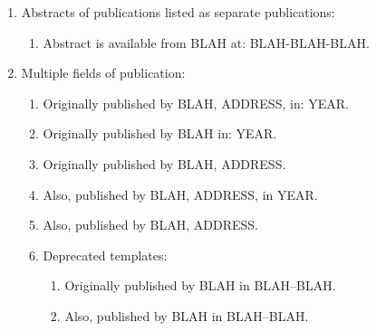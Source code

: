 \documentclass[letter,12pt]{article}
\begin{document}
\begin{enumerate}
\begin{enumerate}
\begin{enumerate}
			\begin{enumerate} \itemsep -1pt
			\item {\tt incollection} (with titles for chapters, sections, subsections, and subsubsections), for the {\tt book}, {\tt booklet}, {\tt techreport}, {\tt phdthesis}, and {\tt mastersthesis}, and {\tt manual} {\sc Bib}\TeX\ entry types.
			\item {\tt inbook} (without titles for chapters, sections, subsections, and subsubsections), for the {\tt book}, {\tt booklet}, {\tt techreport}, {\tt phdthesis}, and {\tt mastersthesis}, and {\tt manual} {\sc Bib}\TeX\ entry types.
			\item {\tt inproceedings}, for the {\tt proceedings} {\sc Bib}\TeX\ entry type.
			\item {\tt article}, for the {\tt book} and {\tt booklet} {\sc Bib}\TeX\ entry types.
			\end{enumerate}
		\item Part of the book/report: BLAH.
		\item This article is part of the journal/magazine issue: BibTeX-KEY.
		\end{enumerate}
	\item Abstracts of publications listed as separate publications: \vspace{-0.2cm}
		\begin{enumerate} \itemsep -2pt
		\item Abstract is available from BLAH at: BLAH-BLAH-BLAH.
		\end{enumerate}
	\item Multiple fields of publication: \vspace{-0.2cm}
		\begin{enumerate} \itemsep -2pt
		\item Originally published by BLAH, ADDRESS, in: YEAR.
		\item Originally published by BLAH in: YEAR.
		\item Originally published by BLAH, ADDRESS.
		\item Also, published by BLAH, ADDRESS, in YEAR.
		\item Also, published by BLAH, ADDRESS.
		\item Deprecated templates: \vspace{-0.1cm}
			\begin{enumerate} \itemsep -1pt
			\item Originally published by BLAH in BLAH--BLAH.
			\item Also, published by BLAH in BLAH--BLAH.

\end{enumerate}
\end{enumerate}
\end{enumerate}
\end{enumerate}
\end{document}
